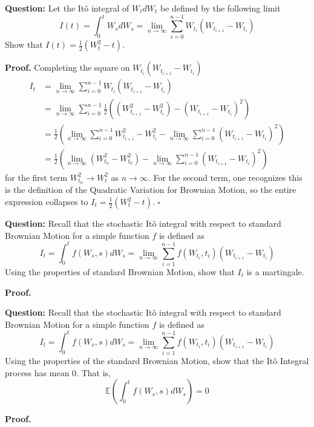 \documentclass{article}
\begin{document}
\begin{tcolorbox}[colframe=black,colback=gray!5,boxrule=0.5pt]
\textbf{Question:} Let the Itô integral of $W_tdW_t$ be defined by the following limit
$$I(t) = \int_0^tW_sdW_s = \lim_{n\to\infty}\sum_{i=0}^{n-1}W_{t_i}(W_{t_{i+1}} - W_{t_i})$$
Show that $I(t) = \frac{1}{2}(W_t^2-t)$.
\end{tcolorbox}
\textbf{Proof.} Completing the square on $W_{t_i}(W_{t_{i+1}} - W_{t_i})$
\begin{align*}
    I_t &= \lim_{n\to\infty}\sum_{i=0}^{n-1}W_{t_i}(W_{t_{i+1}} - W_{t_i}) \\
    &= \lim_{n\to\infty}\sum_{i=0}^{n-1}\frac{1}{2}((W_{t_{i+1}}^2-W_{t_i}^2) - (W_{t_{i+1}} - W_{t_i})^2) \\
    &= \frac{1}{2}\left(\lim_{n\to\infty}\sum_{i=0}^{n-1}W_{t_{i+1}}^2-W_{t_i}^2 - \lim_{n\to\infty}\sum_{i=0}^{n-1}(W_{t_{i+1}}-W_{t_i})^2\right) \\
    &= \frac{1}{2}\left(\lim_{n\to\infty}(W_{t_n}^2 - W_{t_0}^2) -  \lim_{n\to\infty}\sum_{i=0}^{n-1}(W_{t_{i+1}}-W_{t_i})^2\right)
\end{align*}
for the first term $W_{t_n}^2\to W_t^2$ as $n\to\infty$. For the second term, one recognizes this is the definition of the Quadratic Variation for Brownian Motion, so the entire expression collapses to $I_t = \frac{1}{2}(W_t^2-t)$. $\square$

\begin{tcolorbox}[colframe=black,colback=gray!5,boxrule=0.5pt]
\textbf{Question:} Recall that the stochastic Itô integral with respect to standard Brownian Motion for a simple function $f$ is defined as 
$$I_t = \int_0^t f(W_s,s)dW_s = \lim_{n\to\infty}\sum_{i=1}^{n-1}f(W_{t_i}, t_i)(W_{t_{i+1}} - W_{t_i})$$
Using the properties of standard Brownian Motion, show that $I_t$ is a martingale.
\end{tcolorbox}
\textbf{Proof.}


\begin{tcolorbox}[colframe=black,colback=gray!5,boxrule=0.5pt]
\textbf{Question:} Recall that the stochastic Itô integral with respect to standard Brownian Motion for a simple function $f$ is defined as 
$$I_t = \int_0^t f(W_s,s)dW_s = \lim_{n\to\infty}\sum_{i=1}^{n-1}f(W_{t_i}, t_i)(W_{t_{i+1}} - W_{t_i})$$
Using the properties of the standard Brownian Motion, show that the Itô Integral process has mean 0. That is, 
$$\mathbb{E}\left(\int_0^t f(W_s,s)dW_s\right) =0$$
\end{tcolorbox}
\textbf{Proof.}
\end{document}
